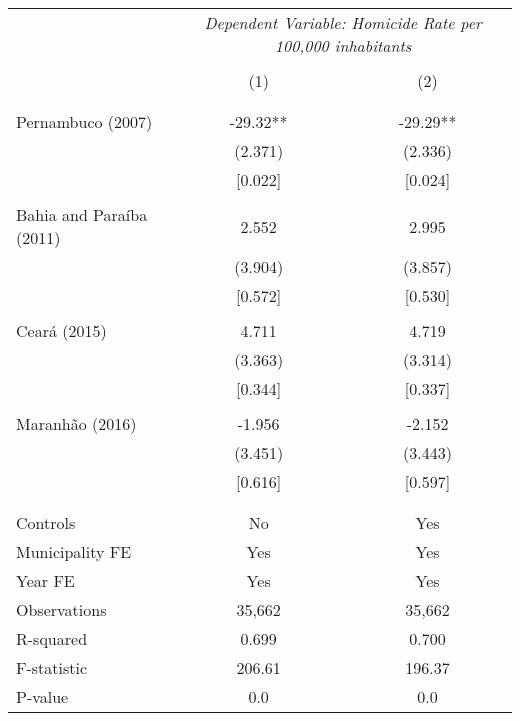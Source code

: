 \documentclass[]{article}
\begin{document}
\begin{table}[htbp]
\centering
\begin{tabular}{lcc} \hline\hline
& \multicolumn{2}{c}{\textit{Dependent Variable: Homicide Rate per 100,000 inhabitants}} \\
\cline{2-3} \\
& (1) & (2) \\ \\ \hline
 &  &  \\
Pernambuco (2007) & -29.32** & -29.29** \\
 & (2.371) & (2.336) \\
 & [0.022] & [0.024] \\\\
Bahia and Paraíba (2011) & 2.552 & 2.995 \\
 & (3.904) & (3.857) \\
 & [0.572] & [0.530] \\\\
Ceará (2015) & 4.711 & 4.719 \\
 & (3.363) & (3.314) \\
 & [0.344] & [0.337] \\\\
Maranhão (2016) & -1.956 & -2.152 \\
 & (3.451) & (3.443) \\
 & [0.616] & [0.597] \\\\
 &  &  \\
\hline
Controls & No & Yes \\
Municipality FE & Yes & Yes \\
Year FE & Yes & Yes \\
Observations & 35,662 & 35,662 \\
R-squared & 0.699 & 0.700 \\
F-statistic & 206.61 & 196.37 \\
P-value & 0.0 & 0.0 \\
\hline\hline
\end{tabular}
\end{table}
\end{document}
